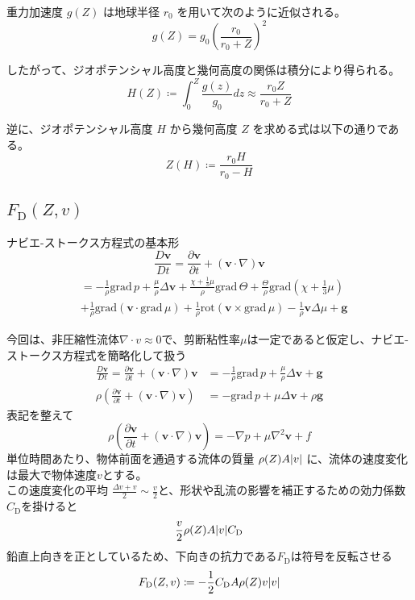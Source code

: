 \documentclass[a4paper,12pt]{article}
\begin{document}
重力加速度 \(g(Z)\) は地球半径 \(r_0\) を用いて次のように近似される。
\[
g(Z) = g_0 \left( \frac{r_0}{r_0 + Z} \right)^2
\]



したがって、ジオポテンシャル高度と幾何高度の関係は積分により得られる。
\[
H(Z) \coloneq \int_0^Z \frac{g(z)}{g_0} dz \approx \frac{r_0 Z}{r_0 + Z}
\]

逆に、ジオポテンシャル高度 \(H\) から幾何高度 \(Z\) を求める式は以下の通りである。
\[
Z(H) \coloneq \frac{r_0 H}{r_0 - H}
\]


\subsection{\texorpdfstring{$F_{\mathrm{D}}(Z, v)$}{F}}
ナビエ-ストークス方程式の基本形
\[
\frac{D\boldsymbol{v}}{Dt} = \frac{\partial \boldsymbol{v}}{\partial t} + \left(\boldsymbol{v} \cdot \nabla\right)\boldsymbol{v}
\]
\begin{align*}
&= -\frac{1}{\rho}\mathrm{grad}\,p + \frac{\mu}{\rho}\Delta\boldsymbol{v} + \frac{\chi + \frac{1}{3}\mu}{\rho}\mathrm{grad}\,\Theta + \frac{\Theta}{\rho}\mathrm{grad}\left(\chi + \frac{1}{3}\mu\right) \\
&+ \frac{1}{\rho}\mathrm{grad}\left(\boldsymbol{v} \cdot \mathrm{grad}\,\mu\right) + \frac{1}{\rho}\mathrm{rot}\left(\boldsymbol{v} \times \mathrm{grad}\,\mu\right) - \frac{1}{\rho}\boldsymbol{v}\Delta\mu + \boldsymbol{g}
\end{align*}

今回は、非圧縮性流体$\nabla\cdot v \approx 0$で、剪断粘性率$\mu$は一定であると仮定し、ナビエ-ストークス方程式を簡略化して扱う
\begin{align*}
  \frac{D\boldsymbol{v}}{Dt} = \frac{\partial \boldsymbol{v}}{\partial t} + \left(\boldsymbol{v} \cdot \nabla\right)\boldsymbol{v} &= -\frac{1}{\rho}\mathrm{grad}\,p + \frac{\mu}{\rho}\Delta\boldsymbol{v} + \boldsymbol{g}\\
  \rho\left(\frac{\partial \boldsymbol{v}}{\partial t} + \left(\boldsymbol{v} \cdot \nabla\right)\boldsymbol{v}\right) &= -\mathrm{grad}\,p + \mu\Delta\boldsymbol{v} + \rho\boldsymbol{g}
\end{align*}
表記を整えて
\[
  \rho\left(\frac{\partial \boldsymbol{v}}{\partial t} + \left(\boldsymbol{v} \cdot \nabla\right)\boldsymbol{v}\right)= -\nabla p + \mu \nabla^2\boldsymbol{v} + f
\]
単位時間あたり、物体前面を通過する流体の質量 $\rho(Z)A\abs{v}$ に、流体の速度変化は最大で物体速度$v$とする。\\
この速度変化の平均 $\frac{\Delta v + v}{2} \sim \frac{v}{2}$と、形状や乱流の影響を補正するための効力係数$C_\mathrm{D}$を掛けると
\[
  \frac{v}{2}\rho(Z)A\abs{v}C_\mathrm{D}
\]
鉛直上向きを正としているため、下向きの抗力である$F_\mathrm{D}$は符号を反転させる
\[
  F_{\mathrm{D}}(Z, v) \coloneq -\frac{1}{2}C_{\mathrm{D}}A\rho(Z)v\abs{v}
\]
\end{document}
